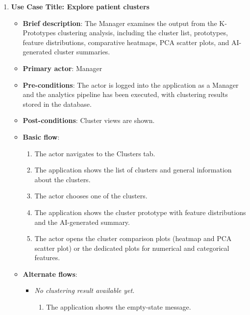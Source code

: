 \begin{enumerate}
\item \textbf{Use Case Title: Explore patient clusters}
\begin{itemize}
    \item \textbf{Brief description}: The Manager examines the output from the K-Prototypes clustering analysis, including the cluster list, prototypes, feature distributions, comparative heatmaps, PCA scatter plots, and AI-generated cluster summaries.
    \item \textbf{Primary actor}: Manager
    \item \textbf{Pre-conditions}: The actor is logged into the application as a Manager and the analytics pipeline has been executed, with clustering results stored in the database.
    \item \textbf{Post-conditions}: Cluster views are shown.
    \item \textbf{Basic flow}:
    \begin{enumerate}
        \item The actor navigates to the Clusters tab.
        \item The application shows the list of clusters and general information about the clusters.
        \item The actor chooses one of the clusters.
        \item The application shows the cluster prototype with feature distributions and the AI-generated summary.
        \item The actor opens the cluster comparison plots (heatmap and PCA scatter plot) or the dedicated plots for numerical and categorical features.
    \end{enumerate}
    \item \textbf{Alternate flows}:
    \begin{itemize}
        \item[1a.] \textit{No clustering result available yet.}
        \begin{enumerate}
            \item The application shows the empty-state message.
        \end{enumerate}
    \end{itemize}
\end{itemize}

\vspace{0.5em}


\end{enumerate}
